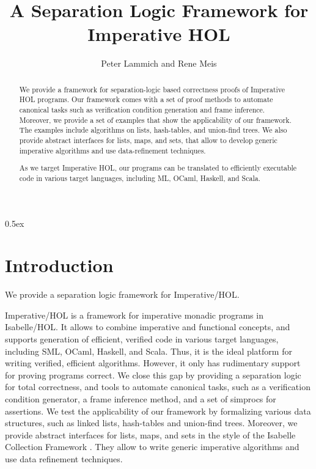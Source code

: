 \documentclass[11pt,a4paper]{article}
\begin{document}
\title{A Separation Logic Framework for Imperative HOL}
\author{Peter Lammich and Rene Meis}
\maketitle

\begin{abstract}
  We provide a framework for separation-logic based correctness proofs of 
  Imperative HOL programs. Our framework comes with a set of proof methods to
  automate canonical tasks such as verification condition generation and 
  frame inference. Moreover, we provide a set of examples that show the 
  applicability of our framework. The examples include algorithms on lists,
  hash-tables, and union-find trees. We also provide abstract interfaces for
  lists, maps, and sets, that allow to develop generic imperative algorithms 
  and use data-refinement techniques.

  As we target Imperative HOL, our programs can be translated to 
  efficiently executable code in various target languages, including
  ML, OCaml, Haskell, and Scala.
\end{abstract}

\tableofcontents

\parindent 0pt\parskip 0.5ex

\section{Introduction}
We provide a separation logic framework for Imperative/HOL.

Imperative/HOL \cite{Bulwahn2008} is a framework for imperative monadic programs
in Isabelle/HOL. It allows to combine imperative and functional concepts, and
supports generation of efficient, verified code in various target languages, 
including SML, OCaml, Haskell, and Scala. 
Thus, it is the ideal platform for writing verified, 
efficient algorithms. However, it only has rudimentary support for proving
programs correct. We close this gap by providing a separation logic 
\cite{OHearn2001} for total correctness, and 
tools to automate canonical tasks, such as a verification condition generator,
a frame inference method, and a set of simprocs for assertions. We test the
applicability of our framework by formalizing various data structures, such as
linked lists, hash-tables and union-find trees. Moreover, we provide abstract 
interfaces for lists, maps, and sets in the style of the 
Isabelle Collection Framework \cite{Lammich2010}. They allow to write 
generic imperative algorithms and use data refinement techniques. 
\end{document}
